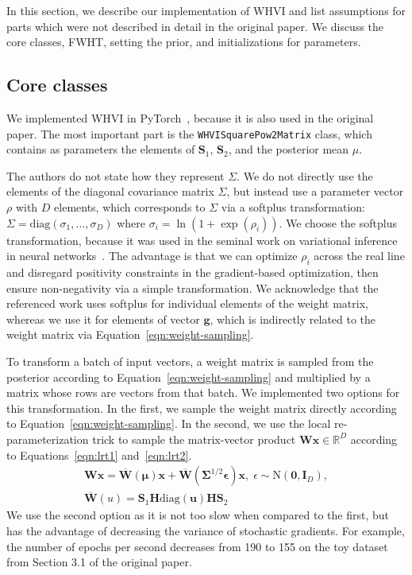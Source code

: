 In this section, we describe our implementation of WHVI and list assumptions for parts which were not described in detail in the original paper.
We discuss the core classes, FWHT, setting the prior, and initializations for parameters.
\subsection{Core classes}\label{subsec:core-classes}
We implemented WHVI in PyTorch~\cite{pytorch}, because it is also used in the original paper.
The most important part is the \texttt{WHVISquarePow2Matrix} class, which contains as parameters the elements of $\mathbf{S}_1$, $\mathbf{S}_2$, and the posterior mean $\mu$.

The authors do not state how they represent $\Sigma$.
We do not directly use the elements of the diagonal covariance matrix $\Sigma$, but instead use a parameter vector $\rho$ with $D$ elements, which corresponds to $\Sigma$ via a softplus transformation: $\Sigma = \mathrm{diag}(\sigma_1, \dots, \sigma_D)$ where $\sigma_i = \ln(1 + \exp(\rho_i))$.
We choose the softplus transformation, because it was used in the seminal work on variational inference in neural networks~\cite{blundell2015weight}.
The advantage is that we can optimize $\rho_i$ across the real line and disregard positivity constraints in the gradient-based optimization, then ensure non-negativity via a simple transformation.
We acknowledge that the referenced work uses softplus for individual elements of the weight matrix, whereas we use it for elements of vector $\mathbf{g}$, which is indirectly related to the weight matrix via Equation~\ref{eqn:weight-sampling}.

To transform a batch of input vectors, a weight matrix is sampled from the posterior according to Equation~\ref{eqn:weight-sampling} and multiplied by a matrix whose rows are vectors from that batch.
We implemented two options for this transformation.
In the first, we sample the weight matrix directly according to Equation~\ref{eqn:weight-sampling}.
In the second, we use the local re-parameterization trick to sample the matrix-vector product $\mathbf{W}\mathbf{x} \in \mathbb{R}^D$ according to Equations~\ref{eqn:lrt1} and~\ref{eqn:lrt2}.
\begin{align}
    \mathbf{W}\mathbf{x} = \overline{\mathbf{W}}(\mathbf{\mu})\mathbf{x} + \overline{\mathbf{W}}(\mathbf{\Sigma}^{1/2}\mathbf{\epsilon})\mathbf{x}, \; \epsilon \sim \mathrm{N}(\mathbf{0}, \mathbf{I}_D)\label{eqn:lrt1},\\
    \overline{\mathbf{W}}(u) = \mathbf{S}_1 \mathbf{H} \mathrm{diag}(\mathbf{u}) \mathbf{H} \mathbf{S}_2\label{eqn:lrt2}
\end{align}
We use the second option as it is not too slow when compared to the first, but has the advantage of decreasing the variance of stochastic gradients.
For example, the number of epochs per second decreases from 190 to 155 on the toy dataset from Section 3.1 of the original paper.

